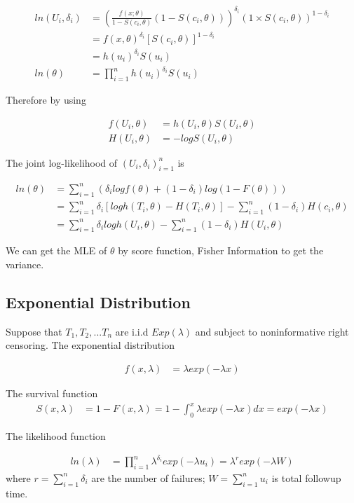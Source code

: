 \documentclass[11pt]{article} %
\begin{document}
\begin{align*}
	ln(U_i, \delta_i) & = \left(\frac{f(x; \theta)}{1- S(c_i, \theta)} (1- S(c_i, \theta)) \right)^{\delta_i} \left(1 \times S(c_i, \theta) \right)^{1-\delta_i} \\
		&=f(x, \theta)^{\delta_i} [S(c_i, \theta)]^{1-\delta_i}\\
		&= h(u_i)^{\delta_i} S(u_i)\\
	ln(\theta) &= \prod_{i=1}^n h(u_i)^{\delta_i} S(u_i)
\end{align*}

	
Therefore by using

\begin{align*}
	f(U_i, \theta) & = h(U_i, \theta) S(U_i, \theta) \\
	H(U_i, \theta) &= -log S(U_i, \theta)
\end{align*}

The joint log-likelihood of ${(U_i, \delta_i)}_{i=1}^n$ is

\begin{align*}
	ln(\theta) & = \sum_{i=1}^n \left(\delta_i log f(\theta) + (1-\delta_i) log (1- F(\theta)) \right) \\
	&= \sum_{i=1}^n \delta_i \left[log h(T_i, \theta) - H(T_i, \theta) \right] - \sum_{i=1}^n  (1-\delta_i) H(c_i, \theta)  \\
	&= \sum_{i=1}^n \delta_i log h(U_i, \theta) - \sum_{i=1}^n  (1-\delta_i) H(U_i,  \theta)
\end{align*}

We can get the MLE of $\theta$ by score function, Fisher Information to get the variance. 

\subsection{Exponential Distribution}
Suppose that $T_1, T_2, ... T_n$ are i.i.d $Exp(\lambda)$ and subject to noninformative right censoring. The exponential distribution

\begin{align*}
	f(x, \lambda) & = \lambda exp(-\lambda x)
\end{align*}

The survival function
\begin{align*}
	S(x, \lambda) & = 1- F(x, \lambda) =1- \int_{0}^x \lambda exp(-\lambda x) dx = exp(-\lambda x)
\end{align*}

The likelihood function

\begin{align*}
	ln(\lambda) & = \prod_{i=1}^n \lambda^{\delta_i} exp(-\lambda u_i) = \lambda^r exp(-\lambda W)
\end{align*}
where $r = \sum_{i=1}^n \delta_i$ are the number of failures; $W=\sum_{i=1}^n u_i$ is total followup time.
\end{document}
